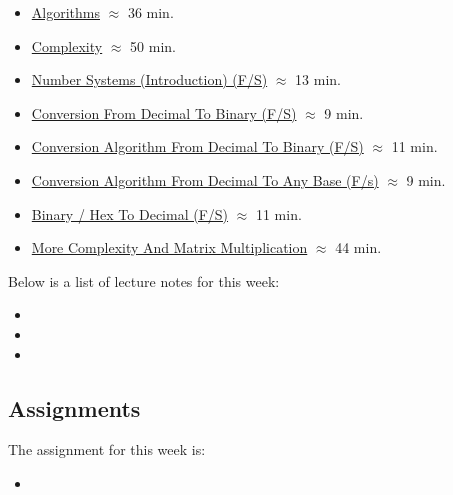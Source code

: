 \begin{itemize}
    \item \href{https://applied.cs.colorado.edu/mod/hvp/view.php?id=51632}{Algorithms} $\approx$ 36 min.
    \item \href{https://applied.cs.colorado.edu/mod/hvp/view.php?id=51633}{Complexity} $\approx$ 50 min.
    \item \href{https://applied.cs.colorado.edu/mod/hvp/view.php?id=51634}{Number Systems (Introduction) (F/S)} $\approx$ 13 min.
    \item \href{https://applied.cs.colorado.edu/mod/hvp/view.php?id=51635}{Conversion From Decimal To Binary (F/S)} $\approx$ 9 min.
    \item \href{https://applied.cs.colorado.edu/mod/hvp/view.php?id=51636}{Conversion Algorithm From Decimal To Binary (F/S)} $\approx$ 11 min.
    \item \href{https://applied.cs.colorado.edu/mod/hvp/view.php?id=51637}{Conversion Algorithm From Decimal To Any Base (F/s)} $\approx$ 9 min.
    \item \href{https://applied.cs.colorado.edu/mod/hvp/view.php?id=51638}{Binary / Hex To Decimal (F/S)} $\approx$ 11 min.
    \item \href{https://applied.cs.colorado.edu/mod/hvp/view.php?id=51639}{More Complexity And Matrix Multiplication} $\approx$ 44 min.
\end{itemize}

\noindent Below is a list of lecture notes for this week:

\begin{itemize}
    \item {}
    \item {}
    \item {}
\end{itemize}

\subsection{Assignments}

The assignment for this week is:

\begin{itemize}
    \item {}
\end{itemize}

